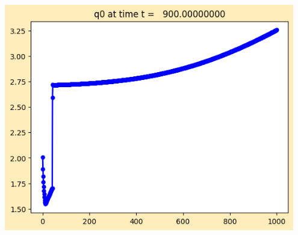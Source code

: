 \documentclass[11pt]{article}
\begin{document}
\vskip 10pt 
\includegraphics[width=0.95\textwidth]{frame0090fig1.png}
\end{document}

